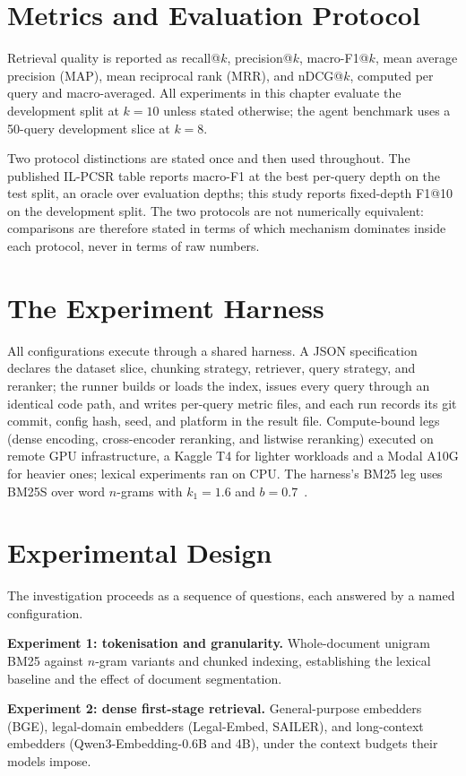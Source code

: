 \documentclass{mnnit}
\begin{document}
\section{Metrics and Evaluation Protocol}
Retrieval quality is reported as recall@$k$, precision@$k$,
macro-F1@$k$, mean average precision (MAP), mean reciprocal rank
(MRR), and nDCG@$k$, computed per query and macro-averaged. All
experiments in this chapter evaluate the development split at
$k=10$ unless stated otherwise; the agent benchmark uses a
50-query development slice at $k=8$.

Two protocol distinctions are stated once and then used
throughout. The published IL-PCSR table reports macro-F1 at the
best per-query depth on the test split, an oracle over evaluation
depths; this study reports fixed-depth F1@10 on the development
split. The two protocols are not numerically equivalent:
comparisons are therefore stated in terms of which mechanism
dominates inside each protocol, never in terms of raw numbers.

\section{The Experiment Harness}
All configurations execute through a shared harness. A JSON
specification declares the dataset slice, chunking strategy,
retriever, query strategy, and reranker; the runner builds or
loads the index, issues every query through an identical code
path, and writes per-query metric files, and each run records its
git commit, config hash, seed, and platform in the result file.
Compute-bound legs (dense encoding, cross-encoder reranking, and
listwise reranking) executed on remote GPU infrastructure, a
Kaggle T4 for lighter workloads and a Modal A10G for heavier
ones; lexical experiments ran on CPU. The harness's BM25 leg uses
BM25S over word $n$-grams with $k_1=1.6$ and $b=0.7$~\cite{bm25s}.

\section{Experimental Design}
The investigation proceeds as a sequence of questions, each
answered by a named configuration.

\noindent\textbf{Experiment 1: tokenisation and granularity.}
Whole-document unigram BM25 against $n$-gram variants and chunked
indexing, establishing the lexical baseline and the effect of
document segmentation.

\noindent\textbf{Experiment 2: dense first-stage retrieval.}
General-purpose embedders (BGE), legal-domain embedders
(Legal-Embed, SAILER), and long-context embedders
(Qwen3-Embedding-0.6B and 4B), under the context budgets their
models impose.
\end{document}
